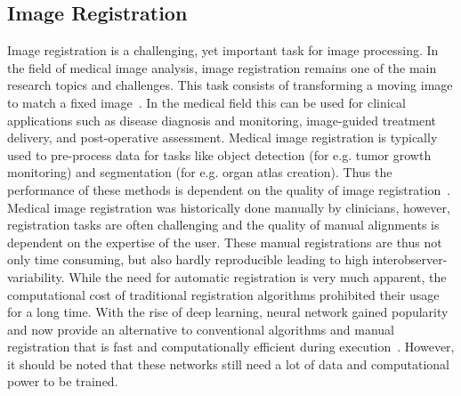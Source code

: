 \documentclass[english,version-2022-01]{uzl-thesis} %
\begin{document}
\subsection{Image Registration} \label{SubSec:ImageRegistration}
Image registration is a challenging, yet important task for image processing. In the field of medical image analysis, image registration remains one of the main research topics and challenges. This task consists of transforming a moving image to match a fixed image~\cite{NiftiReg}. 
In the medical field this can be used for clinical applications such as disease diagnosis and monitoring, image-guided treatment delivery, and post-operative assessment. Medical image registration is typically used to pre-process data for tasks like object detection (for e.g. tumor growth monitoring) and segmentation (for e.g. organ atlas creation).
Thus the performance of these methods is dependent on the quality of image registration~\cite{Chen2020}. \\
Medical image registration was historically done manually by clinicians, however, registration tasks are often challenging and the quality of manual alignments is dependent on the expertise of the user. These manual registrations are thus not only time consuming, but also hardly reproducible leading to high interobserver-variability. While the need for automatic registration is very much apparent, the computational cost of traditional registration algorithms prohibited their usage for a long time. 
With the rise of deep learning, neural network gained popularity and now provide an alternative to conventional algorithms and manual registration that is fast and computationally efficient during execution~\cite{Haskins2020}. However, it should be noted that these networks still need a lot of data and computational power to be trained.\\
\end{document}
